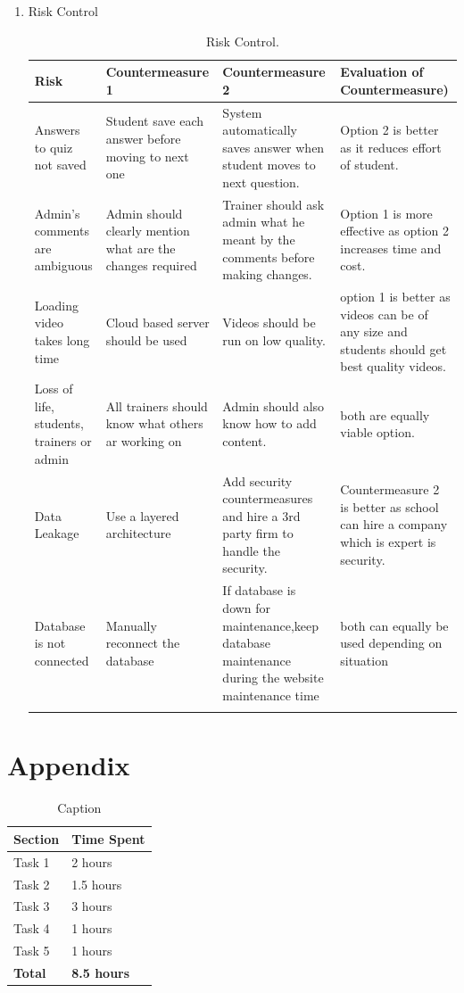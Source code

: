 \documentclass{report}
\begin{document}
\begin{enumerate}
        \item Risk Control \\
        \begin{longtable}{|p{3.5cm}|p{3.5cm}|p{3.5cm}|p{3.5cm}|} \hline
        Risk&Countermeasure 1&Countermeasure 2&Evaluation of Countermeasure)\\ \hline
        Answers to quiz not saved&Student save each answer before moving to next one&System automatically saves answer when student moves to next question.&Option 2 is better as it reduces effort of student.\\ \hline
        Admin's comments are ambiguous&Admin should clearly mention what are the changes required&Trainer should ask admin what he meant by the comments before making changes.&Option 1 is more effective as option 2 increases time and cost.\\ \hline
        Loading video takes long time&Cloud based server should be used&Videos should be run on low quality.&option 1 is better as videos can be of any size and students should get best quality videos.\\ \hline
        Loss of life, students, trainers or admin&All trainers should know what others ar working on&Admin should also know how to add content.&both are equally viable option.\\ \hline
        Data Leakage&Use a layered architecture&Add security countermeasures and hire a 3rd party firm to handle the security.&Countermeasure 2 is better as school can hire a company which is expert is security.\\ \hline
        Database is not connected&Manually reconnect the database&If database is down for maintenance,keep database maintenance during the website maintenance time&both can equally be used depending on situation\\ \hline
        \caption{Risk Control.\label{long}}\\
        \end{longtable}
    \end{enumerate}
    

\section{Appendix}
\begin{table}[htb!]
    \centering
    \begin{tabular}{|p{5.5cm}|p{6.5cm}|}
\hline
\textbf{Section} & \textbf{Time Spent} \\ \hline
Task 1 & 2 hours \\ \hline
Task 2 & 1.5 hours \\ \hline
Task 3 & 3 hours \\ \hline
Task 4 & 1 hours \\ \hline
Task 5 & 1 hours \\ \hline
\textbf{Total} & \textbf{8.5 hours} \\ \hline
\end{tabular}
    \caption{Caption}
    \label{tab:my_label}
\end{table}
\end{document}
